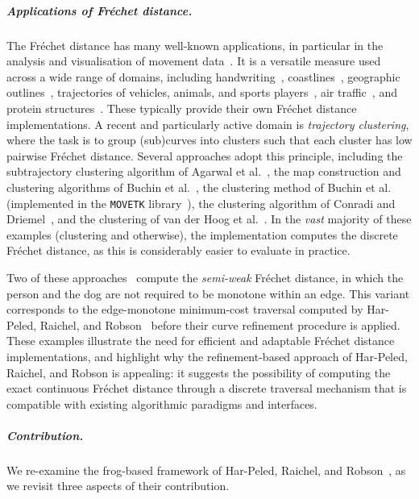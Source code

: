 \documentclass[10pt,a4paper]{article}
\begin{document}
\subparagraph{Applications of Fréchet distance.}
The Fréchet distance has many well-known applications, in particular in the analysis and visualisation of movement data~\cite{buchin2017clustering, buchin2020group, konzack2017visual, xie2017distributed}. 
It is a versatile measure used across a wide range of domains, including handwriting~\cite{sriraghavendra2007frechet}, coastlines~\cite{mascret2006coastline}, geographic outlines~\cite{devogele2002new}, trajectories of vehicles, animals, and sports players~\cite{acmsurvey20, su2020survey, brakatsoulas2005map, buchin2020group}, air traffic~\cite{bombelli2017strategic}, and protein structures~\cite{jiang2008protein}. 
These typically provide their own Fréchet distance implementations.
A recent and particularly active domain is \emph{trajectory clustering}, where the task is to group (sub)curves into clusters such that each cluster has low pairwise Fréchet distance. 
Several approaches adopt this principle, including the subtrajectory clustering algorithm of Agarwal et al.~\cite{agarwal2018subtrajectory}, the map construction and clustering algorithms of Buchin et al.~\cite{buchin2017clustering, buchin2020improved}, the clustering method of Buchin et al.~\cite{buchin2011detecting} (implemented in the \texttt{MOVETK} library~\cite{MOVETK}), the clustering algorithm of Conradi and Driemel~\cite{conradi2023finding}, and the clustering of van der Hoog et al.~\cite{vanderhoo2025Efficient}. 
In the \emph{vast} majority of these examples (clustering and otherwise), the implementation computes the discrete Fréchet distance, as this is considerably easier to evaluate in practice.

Two of these approaches~\cite{buchin2017clustering, buchin2020improved} compute the \emph{semi-weak} Fréchet distance, in which the person and the dog are not required to be monotone within an edge. This variant corresponds to the edge-monotone minimum-cost traversal computed by Har-Peled, Raichel, and Robson~\cite{harpeled_et_al:LIPIcs.SoCG.2025.54} before their curve refinement procedure is applied. 
These examples illustrate the need for efficient and adaptable Fréchet distance implementations, and highlight why the refinement-based approach of Har-Peled, Raichel, and Robson is appealing: it suggests the possibility of computing the exact continuous Fréchet distance through a discrete traversal mechanism that is compatible with existing algorithmic paradigms and interfaces.



\subparagraph{Contribution.}
We re-examine the frog-based framework of Har-Peled, Raichel, and Robson~\cite{harpeled_et_al:LIPIcs.SoCG.2025.54}, as we revisit three aspects of their contribution. 
\end{document}
